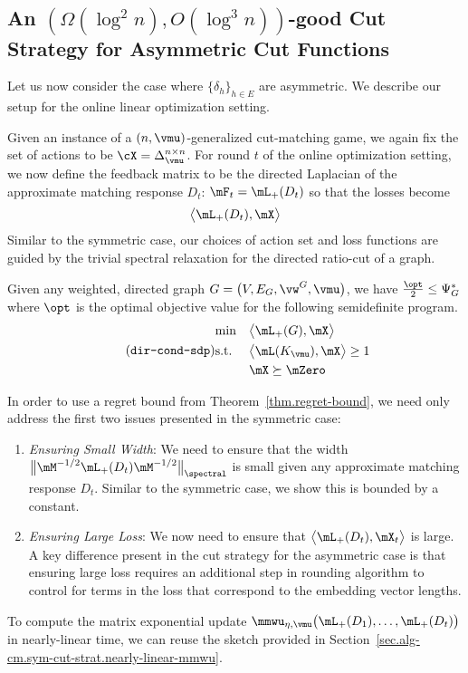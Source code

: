 \documentclass[letterpaper]{article}
\begin{document}
\subsection{An \texorpdfstring{$\left( \Omega (\log^2 n), O ( \log^3 n ) \right)$}{(Omega(log\^2 n), O(log\^3 n))}-good Cut Strategy for Asymmetric Cut Functions}

Let us now consider the case where $\{ \delta_h \}_{h \in E}$ are asymmetric. We describe our setup for the online linear optimization setting.

Given an instance of a $(n, \vmu)$-generalized cut-matching game, we again fix the set of actions to be $\cX = \Delta_{\vmu}^{n \times n}$. For round $t$ of the online optimization setting, we now define the feedback matrix to be the directed Laplacian of the approximate matching response $D_t$: $\mF_t = \mL_{+}(D_t)$ so that the losses become
\begin{equation*}
\big\langle \mL_{+}(D_t), \mX \big\rangle
\end{equation*}
Similar to the symmetric case, our choices of action set and loss functions are guided by the trivial spectral relaxation for the directed ratio-cut of a graph.
\begin{lemma}
\label{lem.asym-cut-strat.relaxation}
Given any weighted, directed graph $G = \big( V, E_G, \vw^G, \vmu \big)$, we have $\frac{\opt}{2} \leq \Psi_G^*$ where $\opt$ is the optimal objective value for the following semidefinite program.
\begin{equation*}
\stepcounter{equation}
\tag{\texttt{dir-cond-sdp}}
\label{eq.dir-cond-sdp}
\begin{aligned}
& {\min}
& & \big\langle \mL_{+}(G), \mX \big\rangle \\
& \textup{s.t.}
& & \big\langle \mL(K_{\vmu}), \mX \big\rangle \geq 1 \\
& & & \mX \succeq \mZero
\end{aligned}
\end{equation*}
\end{lemma}

In order to use a regret bound from Theorem~\ref{thm.regret-bound}, we need only address the first two issues presented in the symmetric case:
\begin{enumerate}[(1)]
\item \emph{Ensuring Small Width}: We need to ensure that the width $\big\lVert \mM^{-1/2} \mL_{+}(D_t) \mM^{-1/2} \big\rVert_{\spectral}$ is small given any approximate matching response $D_t$. Similar to the symmetric case, we show this is bounded by a constant.

\item \emph{Ensuring Large Loss}: We now need to ensure that $\big\langle \mL_{+}(D_t), \mX_t \big\rangle$ is large. A key difference present in the cut strategy for the asymmetric case is that ensuring large loss requires an additional step in rounding algorithm to control for terms in the loss that correspond to the embedding vector lengths.
\end{enumerate}
To compute the matrix exponential update $\mmwu_{\eta, \vmu}\big( \mL_{+}(D_1), \ldots, \mL_{+}(D_t) \big)$ in nearly-linear time, we can reuse the sketch provided in Section~\ref{sec.alg-cm.sym-cut-strat.nearly-linear-mmwu}.
\end{document}
